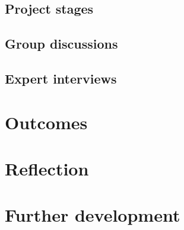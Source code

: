 \subsection{Project stages}
\label{chapter3-project-stages}




\subsection{Group discussions}
\label{chapter3-group-discussions}

\subsection{Expert interviews}
\label{chapter3-expert-interviews}

\section{Outcomes}
\label{chapter3-outcomes}

\section{Reflection}
\label{chapter3-reflection}

\section{Further development}
\label{chapter3-further-development}



